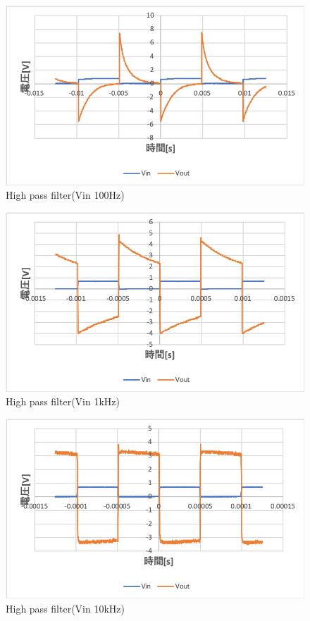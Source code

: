 \documentclass[11pt, a4paper,twocolumn]{jarticle}
\begin{document}
\begin{figure}[htbp]
 \begin{center}
  \includegraphics[width=0.8\linewidth]{fig40.png}
 \end{center}
 \caption{High pass filter(Vin 100Hz)}
 \label{fig:40}
\end{figure}

\begin{figure}[htbp]
 \begin{center}
  \includegraphics[width=0.8\linewidth]{fig41.png}
 \end{center}
 \caption{High pass filter(Vin 1kHz)}
 \label{fig:41}
\end{figure}

\begin{figure}[htbp]
 \begin{center}
  \includegraphics[width=0.8\linewidth]{fig42.png}
 \end{center}
 \caption{High pass filter(Vin 10kHz)}
 \label{fig:42}
\end{figure}
\end{document}
